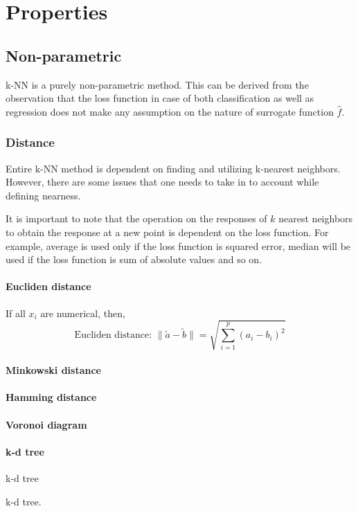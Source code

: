 \documentclass{article}
\begin{document}
\section{Properties}{
    \subsection{Non-parametric}{
        k-NN is a purely non-parametric method. This can be derived from the observation that the loss function in case of both classification as well as regression does not make any assumption on the nature of surrogate function $\hat{f}$.
    }
    \subsubsection{Distance}{
        Entire k-NN method is dependent on finding and utilizing k-nearest neighbors. However, there are some issues that one needs to take in to account while defining nearness. 

        It is important to note that the operation on the responses of $k$ nearest neighbors to obtain the response at a new point is dependent on the loss function. For example, average is used only if the loss function is squared error, median will be used if the loss function is sum of absolute values and so on.

        \paragraph{Eucliden distance}{
            If all $x_i$ are numerical, then,
            \[\text{Eucliden distance: }\| \utilde{a} - \utilde{b}\| = \sqrt{\sum_{i=1}^{p}(a_i - b_i)^2}\]
        }
        \paragraph{Minkowski distance}{}
        \paragraph{Hamming distance}{}
        \paragraph{Voronoi diagram}{}
        \paragraph{k-d tree}{k-d tree}
    }
    k-d tree.
}
\end{document}
